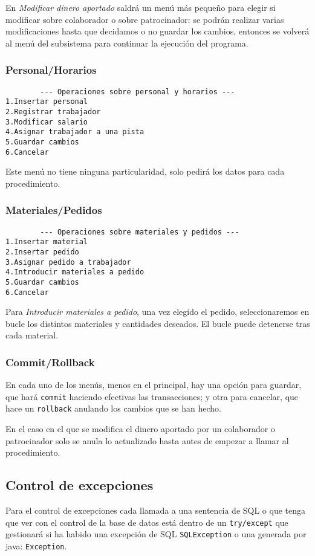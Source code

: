En \textit{Modificar dinero aportado} saldrá un menú más pequeño para elegir
si modificar sobre colaborador o sobre patrocinador: se podrán realizar varias
modificaciones hasta que decidamos o no guardar los cambios, entonces se volverá
al menú del subsistema para continuar la ejecución del programa.

\subsubsection{Personal/Horarios}
\begin{lstlisting}
		--- Operaciones sobre personal y horarios ---
1.Insertar personal
2.Registrar trabajador
3.Modificar salario
4.Asignar trabajador a una pista
5.Guardar cambios
6.Cancelar
\end{lstlisting}

Este menú no tiene ninguna particularidad, solo pedirá los datos para cada
procedimiento.

\pagebreak

\subsubsection{Materiales/Pedidos}
\begin{lstlisting}
		--- Operaciones sobre materiales y pedidos ---
1.Insertar material
2.Insertar pedido
3.Asignar pedido a trabajador
4.Introducir materiales a pedido
5.Guardar cambios
6.Cancelar
\end{lstlisting}

Para \textit{Introducir materiales a pedido}, una vez elegido el pedido,
seleccionaremos en bucle los distintos materiales y cantidades deseados. El bucle
puede detenerse tras cada material.

\subsubsection{Commit/Rollback}
En cada uno de los menús, menos en el principal, hay una opción para guardar,
que hará \texttt{commit} haciendo efectivas las transacciones; y otra para cancelar,
que hace un \texttt{rollback} anulando los cambios que se han hecho.

En el caso en el que se modifica el dinero aportado por un colaborador o
patrocinador solo se anula lo actualizado hasta antes de empezar a llamar al
procedimiento.

\subsection{Control de excepciones}
Para el control de excepciones cada llamada a una sentencia de SQL o que tenga
que ver con el control de la base de datos está dentro de un \texttt{try/except}
que gestionará si ha habido una excepción de SQL \texttt{SQLException} o una
generada por java: \texttt{Exception}.
